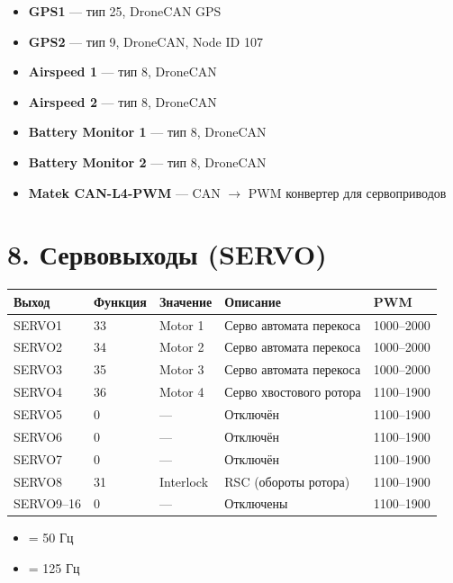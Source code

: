 \documentclass[a4paper,11pt]{article}
\begin{document}
\begin{itemize}[nosep]
  \item \textbf{GPS1} — тип 25, DroneCAN GPS
  \item \textbf{GPS2} — тип 9, DroneCAN, Node ID 107
  \item \textbf{Airspeed 1} — тип 8, DroneCAN
  \item \textbf{Airspeed 2} — тип 8, DroneCAN
  \item \textbf{Battery Monitor 1} — тип 8, DroneCAN
  \item \textbf{Battery Monitor 2} — тип 8, DroneCAN
  \item \textbf{Matek CAN-L4-PWM} — CAN $\to$ PWM конвертер для сервоприводов
\end{itemize}

\section{8. Сервовыходы (SERVO)}

\begin{longtable}{lllll}
  \toprule
  \textbf{Выход} & \textbf{Функция} & \textbf{Значение} & \textbf{Описание} & \textbf{PWM} \\
  \midrule
  SERVO1    & 33 & Motor 1  & Серво автомата перекоса    & 1000–2000 \\
  SERVO2    & 34 & Motor 2  & Серво автомата перекоса    & 1000–2000 \\
  SERVO3    & 35 & Motor 3  & Серво автомата перекоса    & 1000–2000 \\
  SERVO4    & 36 & Motor 4  & Серво хвостового ротора    & 1100–1900 \\
  SERVO5    & 0  & —        & Отключён                  & 1100–1900 \\
  SERVO6    & 0  & —        & Отключён                  & 1100–1900 \\
  SERVO7    & 0  & —        & Отключён                  & 1100–1900 \\
  SERVO8    & 31 & Interlock& RSC (обороты ротора)      & 1100–1900 \\
  SERVO9–16 & 0  & —        & Отключены                 & 1100–1900 \\
  \bottomrule
\end{longtable}

\begin{itemize}[nosep]
  \item {} = 50 Гц
  \item {} = 125 Гц
\end{itemize}
\end{document}
